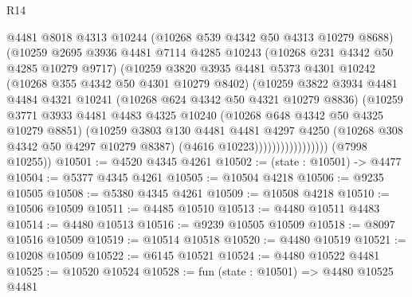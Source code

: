 \begin{lexlean}{R14}
\begin{coremodule}
                            @4481
                            @8018
                            @4313
                            @10244
                            (@10268 @539 @4342 @50 @4313 @10279 @8688)
                            (@10259
                              @2695
                              @3936
                              @4481
                              @7114
                              @4285
                              @10243
                              (@10268 @231 @4342 @50 @4285 @10279 @9717)
                              (@10259
                                @3820
                                @3935
                                @4481
                                @5373
                                @4301
                                @10242
                                (@10268 @355 @4342 @50 @4301 @10279 @8402)
                                (@10259
                                  @3822
                                  @3934
                                  @4481
                                  @4484
                                  @4321
                                  @10241
                                  (@10268 @624 @4342 @50 @4321 @10279 @8836)
                                  (@10259
                                    @3771
                                    @3933
                                    @4481
                                    @4483
                                    @4325
                                    @10240
                                    (@10268 @648 @4342 @50 @4325 @10279 @8851)
                                    (@10259
                                      @3803
                                      @130
                                      @4481
                                      @4481
                                      @4297
                                      @4250
                                      (@10268 @308 @4342 @50 @4297 @10279 @8387)
                                      (@4616 @10223)))))))))))))))))
      (@7998 @10255))
@10501 := @4520 @4345 @4261
@10502 := (state : @10501) -> @4477
@10504 := @5377 @4345 @4261
@10505 := @10504 @4218
@10506 := @9235 @10505
@10508 := @5380 @4345 @4261
@10509 := @10508 @4218
@10510 := @10506 @10509
@10511 := @4485 @10510
@10513 := @4480 @10511 @4483
@10514 := @4480 @10513
@10516 := @9239 @10505 @10509
@10518 := @8097 @10516 @10509
@10519 := @10514 @10518
@10520 := @4480 @10519
@10521 := @10208 @10509
@10522 := @6145 @10521
@10524 := @4480 @10522 @4481
@10525 := @10520 @10524
@10528 := fun (state : @10501) => @4480 @10525 @4481

\end{coremodule}
\end{lexlean}
